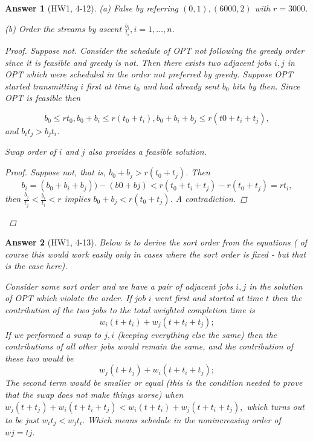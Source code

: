 \documentclass[11pt]{article}
\theoremstyle{numberplain}
\theoremstyle{nonumberplain}
\newtheorem{proof}{Proof}
\newtheorem{ans}{Answer}
\newcommand{\0}{{\mathbf{0}}}
\begin{document}
\begin{ans}[HW1, 4-12](a) False by referring $(0,1), (6000,2)$ with $r=3000$.\par 
(b) Order the streams by ascent $\frac{b_i}{t_i},i=1,\ldots,n$.
\begin{proof} Suppose not. Consider the schedule of OPT not following the greedy order since it is feasible and greedy is not. Then there exists two adjacent jobs $i, j$ in OPT which were scheduled in the
order not preferred by greedy. Suppose OPT started transmitting $i$ first at time $t_0$
and had already sent $b_0$ bits by then. Since OPT is feasible then

$$
b_0\leq rt_0, b_0 + b_i \leq  r(t_0 + t_i), b_0+ b_i + b_j \leq r(t0 + t_i + t_j),
$$
and $b_it_j > b_j t_i$.\par 
\begin{State}
Swap order of $i$ and $j$ also provides a feasible solution.
\end{State}
\begin{proof}Suppose not, that is, $b_0 + b_j > r(t_0 + t_j)$. Then 
$$b_i=(b_0 + b_i + b_j))- (b0 + bj) < r(t_0 + t_i + t_j)- r(t_0 + t_j )=rt_i,$$
then $\frac{b_j}{t_j}<\frac{b_i}{t_i}<r$ implies $b_0 + b_j < r(t_0 + t_j)$. A contradiction.\par 
\end{proof}
\end{proof}
\end{ans}

\begin{ans}[HW1, 4-13]
Below is to derive the sort order from the equations ( of course this would work easily only
in cases where the sort order is fixed - but that is the case here).\par 
Consider some sort order and we have a pair of adjacent jobs $i, j$ in the solution of OPT which violate
the order. If job $i$ went first and started at time $t$ then the contribution of the two jobs to the total weighted completion time is
$$w_i(t + t_i) + w_j(t + t_i + t_j);$$
If we performed a swap to $j, i$ (keeping everything else the same) then the contributions of all other jobs
would remain the same, and the contribution of these two would be
$$w_j(t + t_j) + w_i(t + t_i + t_j);$$
The second term would be smaller or equal (this is the condition needed to prove that the swap does not
make things worse) when
$w_j(t + t_j) + w_i(t + t_i + t_j) < w_i(t + t_i) + w_j(t + t_i + t_j),$
which turns out to be just $w_it_j < w_j t_i$. Which means schedule in the nonincreasing order of $wj=tj$.
\end{ans}
\end{document}
